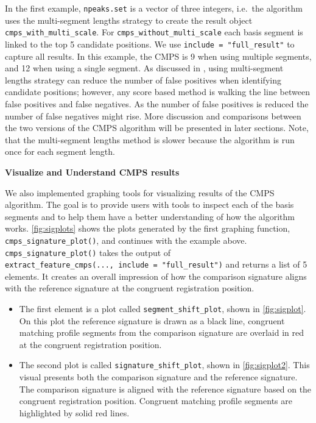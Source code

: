 In the first example, \texttt{npeaks.set} is a vector of three integers,
i.e.~the algorithm uses the multi-segment lengths strategy to create the
result object \texttt{cmps\_with\_multi\_scale}. For
\texttt{cmps\_without\_multi\_scale} each basis segment is linked to the
top 5 candidate positions. We use \texttt{include\ =\ "full\_result"} to
capture all results. In this example, the CMPS is 9 when using multiple
segments, and 12 when using a single segment. As discussed in
\citet{cmps}, using multi-segment lengths strategy can reduce the number
of false positives when identifying candidate positions; however, any
score based method is walking the line between false positives and false
negatives. As the number of false positives is reduced the number of
false negatives might rise. More discussion and comparisons between the
two versions of the CMPS algorithm will be presented in later sections.
Note, that the multi-segment lengths method is slower because the
algorithm is run once for each segment length.

\textbf{Visualize and Understand CMPS results}

We also implemented graphing tools for visualizing results of the CMPS
algorithm. The goal is to provide users with tools to inspect each of
the basis segments and to help them have a better understanding of how
the algorithm works. \autoref{fig:sigplots} shows the plots generated by
the first graphing function, \texttt{cmps\_signature\_plot()}, and
continues with the example above. \texttt{cmps\_signature\_plot()} takes
the output of
\texttt{extract\_feature\_cmps(...,\ include\ =\ "full\_result")} and
returns a list of 5 elements. It creates an overall impression of how
the comparison signature aligns with the reference signature at the
congruent registration position.

\begin{itemize}
\item
  The first element is a plot called \texttt{segment\_shift\_plot},
  shown in \autoref{fig:sigplot}. On this plot the reference signature
  is drawn as a black line, congruent matching profile segments from the
  comparison signature are overlaid in red at the congruent registration
  position.
\item
  The second plot is called \texttt{signature\_shift\_plot}, shown in
  \autoref{fig:sigplot2}. This visual presents both the comparison
  signature and the reference signature. The comparison signature is
  aligned with the reference signature based on the congruent
  registration position. Congruent matching profile segments are
  highlighted by solid red lines.
\end{itemize}

